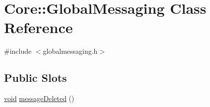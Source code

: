 \hypertarget{class_core_1_1_global_messaging}{\section{\-Core\-:\-:\-Global\-Messaging \-Class \-Reference}
\label{class_core_1_1_global_messaging}
}


{\ttfamily \#include $<$globalmessaging.\-h$>$}

\subsection*{\-Public \-Slots}
\begin{DoxyCompactItemize}
\item 
\hyperlink{group___u_a_v_objects_plugin_ga444cf2ff3f0ecbe028adce838d373f5c}{void} \hyperlink{group___core_plugin_ga4f5538b2b5ae1c4b21a31fcb26b35f5d}{message\-Deleted} ()
\end{DoxyCompactItemize}
